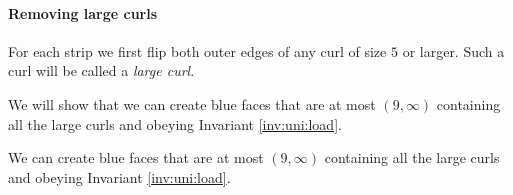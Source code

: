 \paragraph{Removing large curls}

For each strip we first flip both outer edges of any curl of size $5$ or larger. Such a curl will be called a \emph{large curl}.

We will show that we can create blue faces that are at most $(9, \infty)$ containing all the large curls and obeying Invariant \ref{inv:uni:load}.

\begin{lemma}
  \label{lm:}
  We can create blue faces that are at most $(9, \infty)$ containing all the large curls and obeying Invariant \ref{inv:uni:load}.
\end{lemma}


